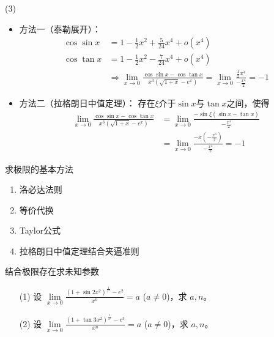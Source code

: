 \documentclass[12pt, a4paper, oneside, UTF8]{ctexbook}
\begin{document}
\begin{solution}
\item[(3)]
\begin{itemize}
\item 方法一（泰勒展开）：
\begin{align*}
\cos\sin x &= 1 - \frac{1}{2}x^{2} + \frac{5}{24}x^{4} + o(x^{4}) \\
\cos\tan x &= 1 - \frac{1}{2}x^{2} - \frac{7}{24}x^{4} + o(x^{4}) \\
&\Rightarrow \lim_{x\to 0}\frac{\cos\sin x - \cos\tan x}{x^{3}(\sqrt{1+x}-e^{x})} = \lim_{x\to 0}\frac{\frac{1}{2}x^{4}}{-\frac{x^{4}}{2}} = -1
\end{align*}

\item 方法二（拉格朗日中值定理）：
存在$\xi$介于$\sin x$与$\tan x$之间，使得
\begin{align*}
\lim_{x\to 0}\frac{\cos\sin x - \cos\tan x}{x^{3}(\sqrt{1+x}-e^{x})} &= \lim_{x\to 0}\frac{-\sin\xi(\sin x - \tan x)}{-\frac{x^{4}}{2}} \\
&= \lim_{x\to 0}\frac{-x(-\frac{x^{3}}{2})}{-\frac{x^{4}}{2}} = -1
\end{align*}
\end{itemize}
\end{solution}
\begin{remark}
    求极限的基本方法
    \begin{enumerate}
        \item 洛必达法则
        \item 等价代换
        \item Taylor公式
        \item 拉格朗日中值定理结合夹逼准则
    \end{enumerate}
\end{remark}

\begin{example} 结合极限存在求未知参数
\begin{enumerate}
    \item[(1)]设 $\lim\limits_{x\to 0}\frac{(1+\sin 2x^{2})^{\frac{1}{x^{2}}}-e^{2}}{x^{n}}=a$ ($a\neq 0$)，求 $a,n$。
    \item[(2)]设 $\lim\limits_{x\to 0}\frac{(1+\tan 3x^{2})^{\frac{1}{x^{2}}}-e^{3}}{x^{n}}=a$ ($a\neq 0$)，求 $a,n$。
\end{enumerate}
\end{example}

\newpage
\end{document}
